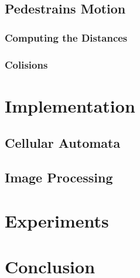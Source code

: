 \subsection{Pedestrains Motion}

\subsubsection{Computing the Distances}

\subsubsection{Colisions}

\section{Implementation}

\subsection{Cellular Automata}

\subsection{Image Processing}

\section{Experiments}

\section{Conclusion}
